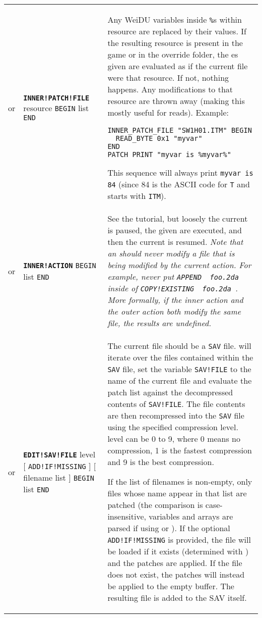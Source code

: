 \documentclass{article}
\def\ttref#1{\ahrefloc{#1}{\tt #1}}
\def\DEFINE#1{{\tt \bf #1}\label{#1}\index{#1}}
\def\DEFSYN#1{{\tt \bf #1}\index{#1}}
\def\t#1{{\tt #1}}
\def\Slist{{\color{red} list }}
\def\Ob{{\color{red} [ }}
\def\Oe{{\color{red} ] }}
\begin{document}
\begin{tabular}{cp{10in}|p{10in}}
or & \DEFINE{INNER!PATCH!FILE} resource \t{BEGIN} \ttref{patch} \Slist \t{END} &
  Any WeiDU variables inside \t{\%}s within resource are replaced by
  their values. If the resulting resource is present in the game or in the
  override folder, the \ttref{patch}es given are evaluated as if the
  current file were that resource. If not, nothing happens. Any
  modifications to that resource are thrown away (making this mostly useful
  for reads).
  Example:
\begin{verbatim}
INNER_PATCH_FILE "SW1H01.ITM" BEGIN
  READ_BYTE 0x1 "myvar"
END
PATCH_PRINT "myvar is %myvar%"
\end{verbatim}
  This sequence will always print \t{myvar is 84} (since 84 is the ASCII
  code for \t{T} and \ttref{SW1H01.ITM} starts with \t{ITM}). \\

or & \DEFSYN{INNER!ACTION} \t{BEGIN} \ttref{TP2 Action} \Slist \t{END} &
  See the \ttref{INNER!ACTION} tutorial, but loosely the current
  \ttref{COPY} is paused, the given \ttref{TP2 Actions} are executed, and
  then the current \ttref{COPY} is resumed. \emph{Note that an
  \ttref{INNER!ACTION} should never modify a file that is being modified by
  the current action. For example, never put \t{APPEND ~foo.2da~} inside of
  \t{COPY!EXISTING ~foo.2da~}. More formally, if the inner action and the
  outer action both modify the same file, the results are undefined.}\\

or & \DEFINE{EDIT!SAV!FILE} level \Ob \t{ADD!IF!MISSING} \Oe \Ob filename \Slist \Oe
\t{BEGIN} \ttref{TP2 Patch} \Slist \t{END} &

  The current file should be a \t{SAV} file. \ttref{EDIT!SAV!FILE}
  will iterate over the files contained within the \t{SAV} file, set
  the variable \t{SAV!FILE} to the name of the current file and
  evaluate the patch list against the decompressed contents of
  \t{SAV!FILE}. The file contents are then recompressed into the
  \t{SAV} file using the specified compression level. level can be 0
  to 9, where 0 means no compression, 1 is the fastest compression and
  9 is the best compression.

  If the list of filenames is non-empty, only files whose name appear
  in that list are patched (the comparison is case-insensitive,
  variables and arrays are parsed if using \ttref{EVALUATE!BUFFER} or
  \ttref{AUTO!EVAL!STRINGS}).  If the optional \t{ADD!IF!MISSING} is
  provided, the file will be loaded if it exists (determined with
  \ttref{FILE!EXISTS!IN!GAME}) and the patches are applied. If the
  file does not exist, the patches will instead be applied to the
  empty buffer. The resulting file is added to the SAV itself.\\



\end{tabular}
\end{document}
